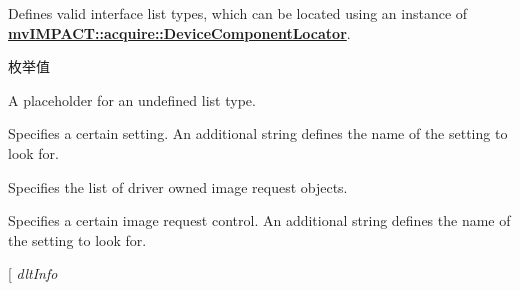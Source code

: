 Defines valid interface list types, which can be located using an instance of {\bfseries \hyperlink{classmv_i_m_p_a_c_t_1_1acquire_1_1_device_component_locator}{mv\+I\+M\+P\+A\+C\+T\+::acquire\+::\+Device\+Component\+Locator}}. 

\begin{Desc}
\item[枚举值]\par
\begin{description}
\item[{\em 
\hypertarget{group___common_interface_gga0dca79bbf0803a4ecec16d6cbb1a3dbba64656c81b86974fb95dfec65a07cd38e}{dlt\+Undefined}\label{group___common_interface_gga0dca79bbf0803a4ecec16d6cbb1a3dbba64656c81b86974fb95dfec65a07cd38e}
}]A placeholder for an undefined list type. \item[{\em 
\hypertarget{group___common_interface_gga0dca79bbf0803a4ecec16d6cbb1a3dbbaf47a23922dbe8011a3bc439f732e54c5}{dlt\+Setting}\label{group___common_interface_gga0dca79bbf0803a4ecec16d6cbb1a3dbbaf47a23922dbe8011a3bc439f732e54c5}
}]Specifies a certain setting. An additional string defines the name of the setting to look for. \item[{\em 
\hypertarget{group___common_interface_gga0dca79bbf0803a4ecec16d6cbb1a3dbbafbeb94d226105486c09f32617b782066}{dlt\+Request}\label{group___common_interface_gga0dca79bbf0803a4ecec16d6cbb1a3dbbafbeb94d226105486c09f32617b782066}
}]Specifies the list of driver owned image request objects. \item[{\em 
\hypertarget{group___common_interface_gga0dca79bbf0803a4ecec16d6cbb1a3dbba1e9f9f72af83e4dcc782e143fe3545b0}{dlt\+Request\+Ctrl}\label{group___common_interface_gga0dca79bbf0803a4ecec16d6cbb1a3dbba1e9f9f72af83e4dcc782e143fe3545b0}
}]Specifies a certain image request control. An additional string defines the name of the setting to look for. \item[{\em 
\hypertarget{group___common_interface_gga0dca79bbf0803a4ecec16d6cbb1a3dbba0a723b8a1e1c07ca9f21e0eecc150cf0}{dlt\+Info}\label{group___common_interface_gga0dca79bbf0803a4ecec16d6cbb1a3dbba0a723b8a1e1c07ca9f21e0eecc150cf0}
}
\end{description}
\end{Desc}

